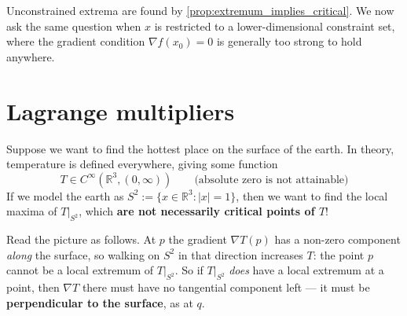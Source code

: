 Unconstrained extrema are found by \cref{prop:extremum_implies_critical}. We now ask the same
question when $x$ is restricted to a lower-dimensional constraint set, where the gradient
condition $\nabla f(x_0) = 0$ is generally too strong to hold anywhere.

\section{Lagrange multipliers}
\label{sec:lagrange_multipliers}

Suppose we want to find the hottest place on the surface of the earth. In theory, temperature is
defined everywhere, giving some function
\[T \in C^\infty(\mathbb{R}^3, (0,\infty)) \qquad \text{(absolute zero is not attainable)}\]
If we model the earth as $S^2 := \{x \in \mathbb{R}^3 : |x| = 1\}$, then we want to find the local
maxima of $T|_{S^2}$, which \textbf{are not necessarily critical points of $T$}!

\begin{center}
\end{center}

Read the picture as follows. At $p$ the gradient $\nabla T(p)$ has a non-zero component
\emph{along} the surface, so walking on $S^2$ in that direction increases $T$: the point $p$
cannot be a local extremum of $T|_{S^2}$. So if $T|_{S^2}$ \emph{does} have a local extremum at a
point, then $\nabla T$ there must have no tangential component left --- it must be
\textbf{perpendicular to the surface}, as at $q$.

